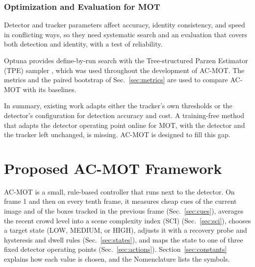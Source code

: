 \documentclass[journal]{new-aiaa}
\begin{document}
\subsubsection{Optimization and Evaluation for MOT}
Detector and tracker parameters affect accuracy, identity consistency, and
speed in conflicting ways, so they need systematic search and an evaluation
that covers both detection and identity, with a test of reliability.

Optuna provides define-by-run search with the Tree-structured Parzen Estimator
(TPE) sampler \cite{akiba2019optuna}, which was used throughout the
development of AC-MOT. The metrics and the paired
bootstrap of Sec.~\ref{sec:metrics} are used to compare AC-MOT with its
baselines.

In summary, existing work adapts either the tracker's own thresholds or the
detector's configuration for detection accuracy and cost. A training-free
method that adapts the detector operating point online for MOT, with the
detector and the tracker left unchanged, is missing. AC-MOT is designed to
fill this gap.
\section{Proposed AC-MOT Framework}\label{sec:method}
AC-MOT is a small, rule-based controller that runs next to the detector. On
frame 1 and then on every tenth frame, it measures cheap cues of the current
image and of the boxes tracked in the previous frame (Sec.~\ref{sec:cues}),
averages the recent crowd level into a scene complexity index (SCI)
(Sec.~\ref{sec:sci}), chooses a target state (LOW, MEDIUM, or HIGH), adjusts
it with a recovery probe and hysteresis and dwell rules
(Sec.~\ref{sec:states}), and maps the state to one of three fixed detector
operating points (Sec.~\ref{sec:actions}). Section~\ref{sec:constants}
explains how each value is chosen, and the Nomenclature lists the symbols.
\end{document}
